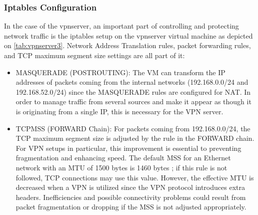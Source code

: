 \documentclass[12pt, fleqn, a4paper]{article}
\begin{document}
\subsubsection{Iptables Configuration}
\begin{table}[H]
	\caption{Iptables rules on vpnserver}
	\centering
  \label{tab:vpnserver3}
\end{table}
In the case of the vpnserver, an important part of controlling and protecting network traffic is the iptables setup on the vpnserver virtual machine as depicted on \cref{tab:vpnserver3}. Network Address Translation rules, packet forwarding rules, and TCP maximum segment size settings are all part of it:
\begin{itemize}
\item MASQUERADE (POSTROUTING): The VM can transform the IP addresses of packets coming from the internal networks (192.168.0.0/24 and 192.168.52.0/24) since the MASQUERADE rules are configured for NAT. In order to manage traffic from several sources and make it appear as though it is originating from a single IP, this is necessary for the VPN server.
\item TCPMSS (FORWARD Chain): For packets coming from 192.168.0.0/24, the TCP maximum segment size is adjusted by the rule in the FORWARD chain. For VPN setups in particular, this improvement is essential to preventing fragmentation and enhancing speed. The default MSS for an Ethernet network with an MTU of 1500 bytes is 1460 bytes \citep{mtu}; if this rule is not followed, TCP connections may use this value. However, the effective MTU is decreased when a VPN is utilized since the VPN protocol introduces extra headers. Inefficiencies and possible connectivity problems could result from packet fragmentation or dropping if the MSS is not adjusted appropriately.
\end{itemize}
\end{document}
